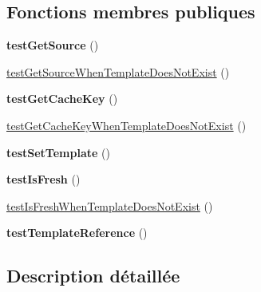 \subsection*{Fonctions membres publiques}
\begin{DoxyCompactItemize}
\item 
{\bfseries test\+Get\+Source} ()\hypertarget{class_twig___tests___loader___array_test_a3881ac59db6e56947aea2ef1e9d40aef}{}\label{class_twig___tests___loader___array_test_a3881ac59db6e56947aea2ef1e9d40aef}

\item 
\hyperlink{class_twig___tests___loader___array_test_a1732f5ce8510e389aff3d42b4286beea}{test\+Get\+Source\+When\+Template\+Does\+Not\+Exist} ()
\item 
{\bfseries test\+Get\+Cache\+Key} ()\hypertarget{class_twig___tests___loader___array_test_ac0d47f7d43ac83b097c7b95c29a55a41}{}\label{class_twig___tests___loader___array_test_ac0d47f7d43ac83b097c7b95c29a55a41}

\item 
\hyperlink{class_twig___tests___loader___array_test_a6f86d1d270770b4f976ba195b1301040}{test\+Get\+Cache\+Key\+When\+Template\+Does\+Not\+Exist} ()
\item 
{\bfseries test\+Set\+Template} ()\hypertarget{class_twig___tests___loader___array_test_a6010e2208b3bb3bac4a887eaba02cb46}{}\label{class_twig___tests___loader___array_test_a6010e2208b3bb3bac4a887eaba02cb46}

\item 
{\bfseries test\+Is\+Fresh} ()\hypertarget{class_twig___tests___loader___array_test_a62450fd94e11766a8699d3792906cee7}{}\label{class_twig___tests___loader___array_test_a62450fd94e11766a8699d3792906cee7}

\item 
\hyperlink{class_twig___tests___loader___array_test_a9026cf468687c965e26b8f2527b308d2}{test\+Is\+Fresh\+When\+Template\+Does\+Not\+Exist} ()
\item 
{\bfseries test\+Template\+Reference} ()\hypertarget{class_twig___tests___loader___array_test_afab9ee791f3c11543515b45a4b933aaf}{}\label{class_twig___tests___loader___array_test_afab9ee791f3c11543515b45a4b933aaf}

\end{DoxyCompactItemize}


\subsection{Description détaillée}


